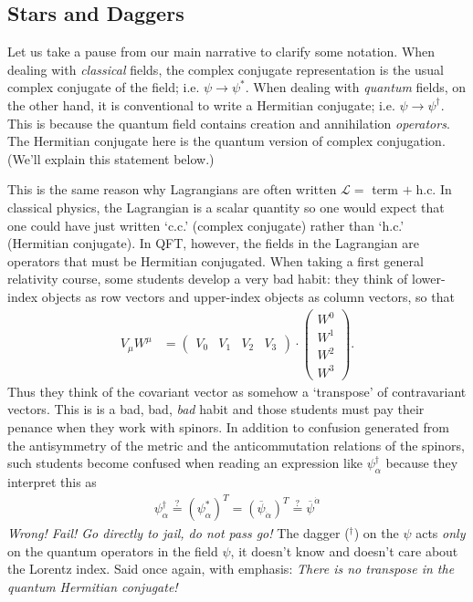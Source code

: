 \documentclass[12pt, oneside]{report}    %
\begin{document}
\subsection{Stars and Daggers}\label{sec:SUSYalg:starsanddaggers}


Let us take a pause from our main narrative to clarify some notation. When dealing with \textit{classical} fields, the complex conjugate representation is the usual complex conjugate of the field; i.e. $\psi \rightarrow \psi^*$. When dealing with \textit{quantum} fields, on the other hand, it is conventional to write a Hermitian conjugate; i.e. $\psi \rightarrow \psi^\dag$. This is because the quantum field contains creation and annihilation \textit{operators}. The Hermitian conjugate here is the quantum version of complex conjugation. (We'll explain this statement below.)

This is the same reason why Lagrangians are often written $\mathcal L =$ term $+\; \text{h.c.}$ 
%
In classical physics, the Lagrangian is a scalar quantity so one would expect that one could have just written `c.c.' (complex conjugate) rather than `h.c.' (Hermitian conjugate). In QFT, however, the fields in the Lagrangian are operators that must be Hermitian conjugated.
 When taking a first general relativity course, some students develop a very bad habit: they think of lower-index objects as row vectors and upper-index objects as column vectors, so that
\begin{align}
    V_\mu W^\mu &= \begin{pmatrix}
        V_0 & V_1 & V_2 & V_3
    \end{pmatrix}\cdot
    \begin{pmatrix}
        W^0 \\ W^1 \\ W^2 \\ W^3
    \end{pmatrix}.
\end{align}
Thus they think of the covariant vector as somehow a `transpose' of contravariant vectors. This is is a bad, bad, \textit{bad} habit and those students must pay their penance when they work with spinors. In addition to confusion generated from the antisymmetry of the metric and the anticommutation relations of the spinors, such students become confused when reading an expression like $\psi_\alpha^\dag$ because they interpret this as 
\begin{align}
    \psi_\alpha^\dag \stackrel{?}{=} (\psi_\alpha^*)^T = (\overline\psi_{\dot\alpha})^T \stackrel{?}{=} \overline\psi^{\dot\alpha}
\end{align}
\textit{Wrong! Fail! Go directly to jail, do not pass go!}
The dagger ($^\dag$) on the $\psi$ acts \textit{only} on the quantum operators in the field $\psi$, it doesn't know and doesn't care about the Lorentz index. Said once again, with emphasis: \textit{There is no transpose in the quantum Hermitian conjugate!}
\end{document}
